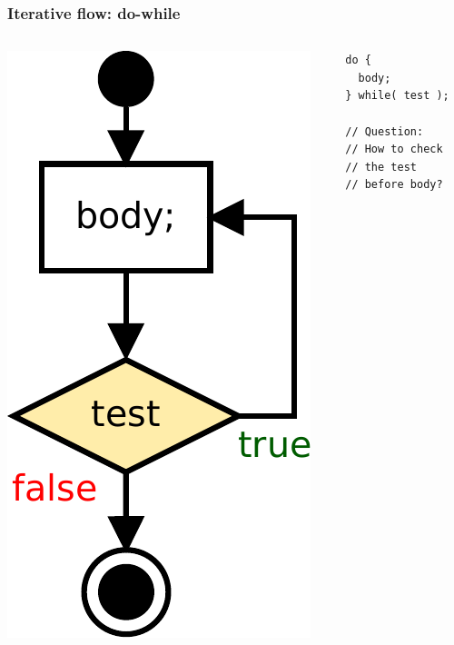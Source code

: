 \begin{frame}[fragile]
\frametitle{Iterative flow: do-while}
\begin{columns}[c]
  \begin{column}{0.5\textwidth}
  \hfill
\includegraphics[scale=0.5]{figures/flow-do}
  \end{column}
  \begin{column}{0.5\textwidth}
\begin{lstlisting}
do {
  body;
} while( test );

// Question:
// How to check
// the test
// before body?
\end{lstlisting}
  \end{column}
\end{columns}
\end{frame}

